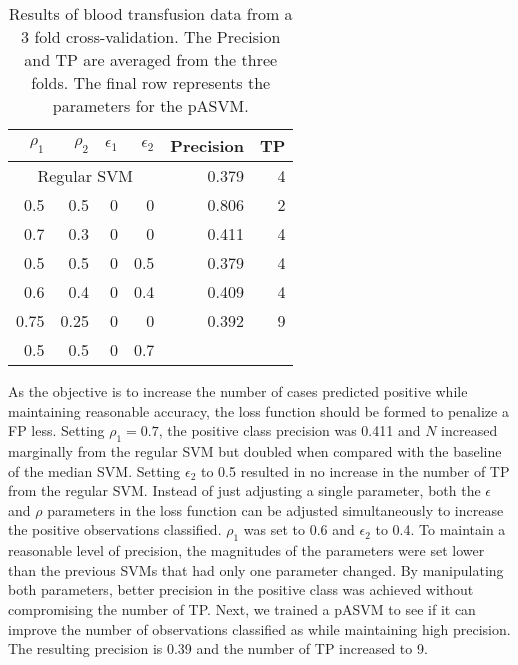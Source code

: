 \documentclass[twoside,11pt]{article}
\begin{document}
\begin{table}[htp]
\centering
\begin{tabular}{rrrr|rr}
\hline
$\rho_1$ & $\rho_2$ & $\epsilon_1$ & $\epsilon_2$ & Precision & TP \bigstrut\\
\hline
\hline
 \multicolumn{4}{c|}{Regular SVM}     & 0.379 & 4 \bigstrut\\
\hline
0.5   & 0.5   & 0     & 0     & 0.806 & 2 \bigstrut\\
\hline
0.7   & 0.3   & 0     & 0     & 0.411 & 4 \bigstrut\\
\hline
0.5   & 0.5   & 0     & 0.5   & 0.379 & 4 \bigstrut\\
\hline
0.6   & 0.4   & 0     & 0.4   & 0.409 & 4 \bigstrut\\
\hline
0.75  & 0.25  & 0     & 0     & 0.392 & 9 \bigstrut[t]\\
0.5   & 0.5   & 0     & 0.7   &       &  \bigstrut[b]\\
\hline
\hline
\end{tabular}%
\caption{Results of blood transfusion data from a 3 fold cross-validation. The Precision and TP are averaged from the three folds. The final row represents the parameters for the pASVM.}
\label{bloodtransfusion}
\end{table}

As the objective is to increase the number of cases predicted positive while maintaining reasonable accuracy, the loss function should be formed to penalize a FP less. Setting $\rho_1=0.7$, the positive class precision was 0.411 and $N$ increased marginally from the regular SVM but doubled when compared with the baseline of the median SVM. Setting $\epsilon_2$ to 0.5 resulted in no increase in the number of TP from the regular SVM. Instead of just adjusting a single parameter, both the $\epsilon$ and $\rho$ parameters in the loss function can be adjusted simultaneously to increase the positive observations classified. $\rho_1$ was set to 0.6 and $\epsilon_2$ to 0.4. To maintain a reasonable level of precision, the magnitudes of the parameters were set lower than the previous SVMs that had only one parameter changed. By manipulating both parameters, better precision in the positive class was achieved without compromising the number of TP. Next, we trained a pASVM to see if it can improve the number of observations classified as while maintaining high precision. The resulting precision is 0.39 and the number of TP increased to 9.
\end{document}

